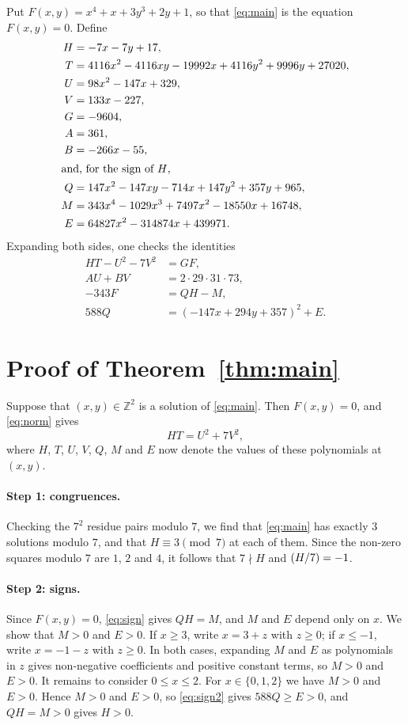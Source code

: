 \documentclass[11pt]{article}
\newcommand{\Z}{\mathbb{Z}}
\newcommand{\leg}[2]{\mathchoice{\biggl(\dfrac{#1}{#2}\biggr)}{(#1/#2)}{(#1/#2)}{(#1/#2)}}
\begin{document}
Put $F(x,y)=x^{4}+x+3y^{3}+2y+1$, so that \eqref{eq:main} is the equation $F(x,y)=0$. Define
\begin{align*}
H&=-7x-7y+17,\\
T&=4116x^{2}-4116xy-19992x+4116y^{2}+9996y+27020,\\
U&=98x^{2}-147x+329,\\
V&=133x-227,\\
G&=-9604,\\
A&=361,\\
B&=-266x-55,\\
\intertext{and, for the sign of $H$,}
Q&=147x^{2}-147xy-714x+147y^{2}+357y+965,\\
M&=343x^{4}-1029x^{3}+7497x^{2}-18550x+16748,\\
E&=64827x^{2}-314874x+439971.
\end{align*}
Expanding both sides, one checks the identities
\begin{align}
HT-U^2-7V^2&=GF,\label{eq:norm}\\
AU+BV&=2\cdot 29\cdot 31\cdot 73,\label{eq:bezout}\\
-343F&=QH-M,\label{eq:sign}\\
588Q&=(-147x+294y+357)^2+E.\label{eq:sign2}
\end{align}

\section{Proof of Theorem~\ref{thm:main}}

Suppose that $(x,y)\in\Z^2$ is a solution of \eqref{eq:main}. Then $F(x,y)=0$, and \eqref{eq:norm} gives
\begin{equation}\label{eq:HT}
HT=U^2+7V^2,
\end{equation}
where $H$, $T$, $U$, $V$, $Q$, $M$ and $E$ now denote the values of these polynomials at $(x,y)$.

\paragraph{Step 1: congruences.} Checking the $7^2$ residue pairs modulo $7$, we find that \eqref{eq:main} has exactly 3 solutions modulo $7$, and that $H\equiv3\pmod{7}$ at each of them. Since the non-zero squares modulo $7$ are $1$, $2$ and $4$, it follows that $7\nmid H$ and $\leg{H}{7}=-1$.

\paragraph{Step 2: signs.} Since $F(x,y)=0$, \eqref{eq:sign} gives $QH=M$, and $M$ and $E$ depend only on $x$. We show that $M>0$ and $E>0$. If $x\geq3$, write $x=3+z$ with $z\geq0$; if $x\leq-1$, write $x=-1-z$ with $z\geq0$. In both cases, expanding $M$ and $E$ as polynomials in $z$ gives non-negative coefficients and positive constant terms, so $M>0$ and $E>0$. It remains to consider $0\leq x\leq2$. For $x\in\{0,1,2\}$ we have $M>0$ and $E>0$. Hence $M>0$ and $E>0$, so \eqref{eq:sign2} gives $588Q\geq E>0$, and $QH=M>0$ gives $H>0$.
\end{document}
